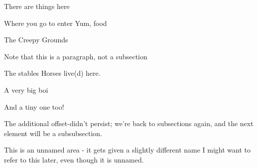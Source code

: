 \begin{RpgMap}[
        header-offset=1,%
        title={Example Map}
    ]

        There are things here

    \begin{RpgMap}[
        title={ignored-as-nested}
        ]
            Where you go to enter
            Yum, food
    \end{RpgMap}

    \begin{RpgNestedArea}[][header-offset=2]
        {The Creepy Grounds}

            Note that this is a paragraph, not a subsection
         \begin{RpgNestedArea}{The stables}
            Horses live(d) here.
			
				A very big boi

				And a tiny one too!
		 \end{RpgNestedArea}
    \end{RpgNestedArea}

        The additional offset-didn't persist; we're back to subsections again, and the next element will be a subsubsection.

		\begin{RpgMap}[
			blank-prefix={Tomb~}
        	]
			\RpgArea{}
				This is an unnamed area - it gets given a slightly different name
				I might want to refer to this later, even though it is unnamed.
		\end{RpgMap}
\end{RpgMap}
